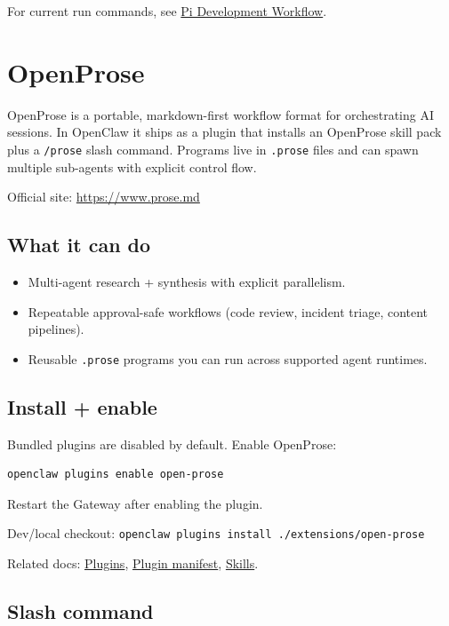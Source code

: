 For current run commands, see \href{/pi-dev}{Pi Development Workflow}.


\clearpage

\section{OpenProse}


OpenProse is a portable, markdown-first workflow format for orchestrating AI sessions. In OpenClaw it ships as a plugin that installs an OpenProse skill pack plus a \texttt{/prose} slash command. Programs live in \texttt{.prose} files and can spawn multiple sub-agents with explicit control flow.

Official site: \href{https://www.prose.md}{https://www.prose.md}

\subsection{What it can do}


\begin{itemize}
  \item Multi-agent research + synthesis with explicit parallelism.
  \item Repeatable approval-safe workflows (code review, incident triage, content pipelines).
  \item Reusable \texttt{.prose} programs you can run across supported agent runtimes.
\end{itemize}


\subsection{Install + enable}


Bundled plugins are disabled by default. Enable OpenProse:

\begin{lstlisting}[language=bash]
openclaw plugins enable open-prose
\end{lstlisting}


Restart the Gateway after enabling the plugin.

Dev/local checkout: \texttt{openclaw plugins install ./extensions/open-prose}

Related docs: \href{/tools/plugin}{Plugins}, \href{/plugins/manifest}{Plugin manifest}, \href{/tools/skills}{Skills}.

\subsection{Slash command}


